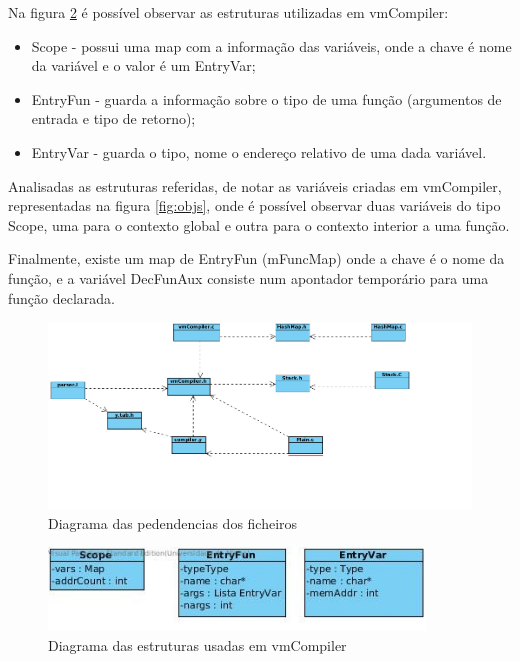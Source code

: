 \documentclass[a4paper,10pt]{report}
\begin{document}
    Na figura \ref{fig:struct} é possível observar as estruturas utilizadas em vmCompiler:
    \begin{itemize}
      \item Scope - possui uma map com a informação das variáveis, onde a chave é nome da variável e o valor é um EntryVar;
      \item EntryFun - guarda a informação sobre o tipo de uma função (argumentos de entrada e tipo de retorno);
      \item EntryVar - guarda o tipo, nome o endereço relativo de uma dada variável.
    \end{itemize}

    Analisadas as estruturas referidas, de notar as variáveis criadas em vmCompiler, representadas na figura \ref{fig:objs}, onde é possível observar duas variáveis do tipo Scope, uma para o contexto global e outra para o contexto interior a uma função.

    Finalmente, existe um map de EntryFun (mFuncMap) onde a chave é o nome da função, e a variável DecFunAux consiste num apontador temporário para uma função declarada.

\begin{figure}
\centering
\includegraphics[width=15cm]{imagens/dependecias.png}
\caption{Diagrama das pedendencias dos ficheiros}
\label{fig:dependencias}
\end{figure}

\begin{figure}
\centering
\includegraphics[width=10cm]{imagens/estruturas.jpg}
\caption{Diagrama das estruturas usadas em vmCompiler}
\label{fig:struct}
\end{figure}
\end{document}
